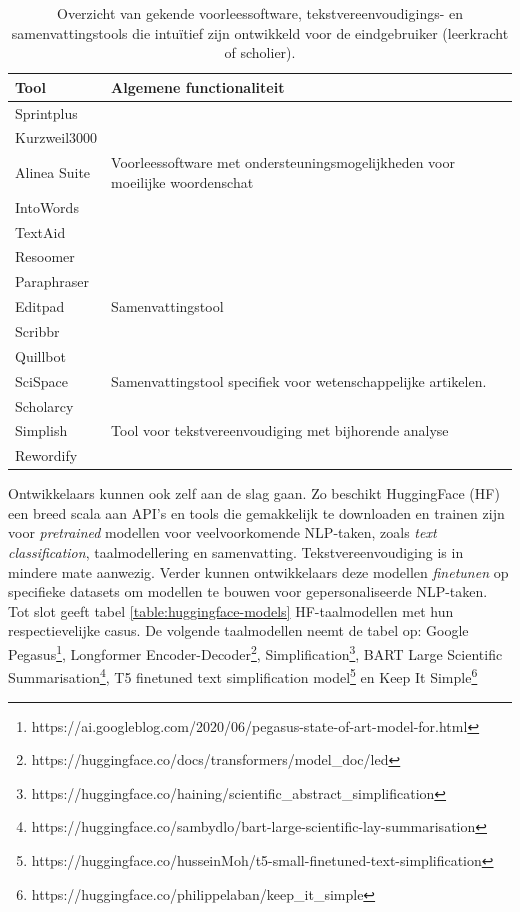 \begin{center}
	\begin{table}[H]
		\begin{tabular}{ | m{4cm} | m{11cm} | } 
		\hline
		\textbf{Tool} & \textbf{Algemene functionaliteit} \\
		\hline
		Sprintplus & \\
		Kurzweil3000 & \\
		Alinea Suite & Voorleessoftware met ondersteuningsmogelijkheden voor moeilijke woordenschat \\
		IntoWords & \\
		TextAid & \\
		\hline
		Resoomer &  \\
		Paraphraser & \\
		Editpad & Samenvattingstool \\
		Scribbr & \\
		Quillbot & \\
		\hline
		SciSpace & Samenvattingstool specifiek voor wetenschappelijke artikelen. \\
		Scholarcy & \\
		\hline
		Simplish & Tool voor tekstvereenvoudiging met bijhorende analyse\\
		Rewordify & \\
		\hline
		\end{tabular}
	\caption{Overzicht van gekende voorleessoftware, tekstvereenvoudigings- en samenvattingstools die intuïtief zijn ontwikkeld voor de eindgebruiker (leerkracht of scholier).}
	\label{table:overview-tools}
	\end{table}
\end{center}

\medspace

Ontwikkelaars kunnen ook zelf aan de slag gaan. Zo beschikt HuggingFace (HF) een breed scala aan API's en tools die gemakkelijk te downloaden en trainen zijn voor \textit{pretrained} modellen voor veelvoorkomende NLP-taken, zoals \textit{text classification}, taalmodellering en samenvatting. Tekstvereenvoudiging is in mindere mate aanwezig. Verder kunnen ontwikkelaars deze modellen \textit{finetunen} op specifieke datasets om modellen te bouwen voor gepersonaliseerde NLP-taken. Tot slot geeft tabel \ref{table:huggingface-models} HF-taalmodellen met hun respectievelijke casus. De volgende taalmodellen neemt de tabel op: Google Pegasus\footnote{https://ai.googleblog.com/2020/06/pegasus-state-of-art-model-for.html}, Longformer Encoder-Decoder\footnote{https://huggingface.co/docs/transformers/model\_doc/led}, Simplification\footnote{https://huggingface.co/haining/scientific\_abstract\_simplification}, BART Large Scientific Summarisation\footnote{https://huggingface.co/sambydlo/bart-large-scientific-lay-summarisation}, T5 finetuned text simplification model\footnote{https://huggingface.co/husseinMoh/t5-small-finetuned-text-simplification} en Keep It Simple\footnote{https://huggingface.co/philippelaban/keep\_it\_simple}

